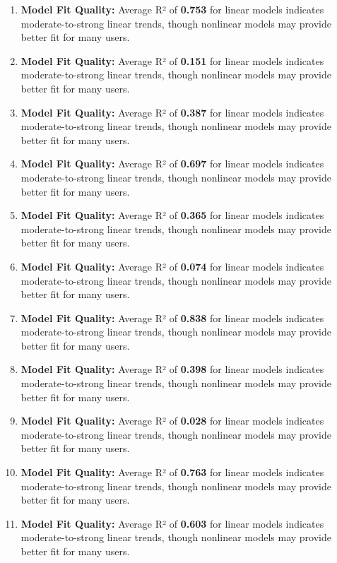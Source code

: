 \documentclass[
]{article}
\begin{document}
\begin{enumerate}
  models indicates moderate-to-strong linear trends, though nonlinear
  models may provide better fit for many users.
\item
  \textbf{Model Fit Quality:} Average R² of \textbf{0.753} for linear
  models indicates moderate-to-strong linear trends, though nonlinear
  models may provide better fit for many users.
\item
  \textbf{Model Fit Quality:} Average R² of \textbf{0.151} for linear
  models indicates moderate-to-strong linear trends, though nonlinear
  models may provide better fit for many users.
\item
  \textbf{Model Fit Quality:} Average R² of \textbf{0.387} for linear
  models indicates moderate-to-strong linear trends, though nonlinear
  models may provide better fit for many users.
\item
  \textbf{Model Fit Quality:} Average R² of \textbf{0.697} for linear
  models indicates moderate-to-strong linear trends, though nonlinear
  models may provide better fit for many users.
\item
  \textbf{Model Fit Quality:} Average R² of \textbf{0.365} for linear
  models indicates moderate-to-strong linear trends, though nonlinear
  models may provide better fit for many users.
\item
  \textbf{Model Fit Quality:} Average R² of \textbf{0.074} for linear
  models indicates moderate-to-strong linear trends, though nonlinear
  models may provide better fit for many users.
\item
  \textbf{Model Fit Quality:} Average R² of \textbf{0.838} for linear
  models indicates moderate-to-strong linear trends, though nonlinear
  models may provide better fit for many users.
\item
  \textbf{Model Fit Quality:} Average R² of \textbf{0.398} for linear
  models indicates moderate-to-strong linear trends, though nonlinear
  models may provide better fit for many users.
\item
  \textbf{Model Fit Quality:} Average R² of \textbf{0.028} for linear
  models indicates moderate-to-strong linear trends, though nonlinear
  models may provide better fit for many users.
\item
  \textbf{Model Fit Quality:} Average R² of \textbf{0.763} for linear
  models indicates moderate-to-strong linear trends, though nonlinear
  models may provide better fit for many users.
\item
  \textbf{Model Fit Quality:} Average R² of \textbf{0.603} for linear
  models indicates moderate-to-strong linear trends, though nonlinear
  models may provide better fit for many users.
\end{enumerate}
\end{document}
